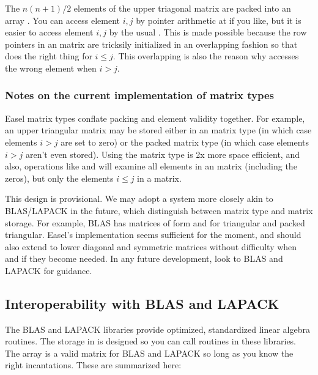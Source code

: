 The $n (n+1) / 2$ elements of the upper triagonal matrix are packed
into an array . You can access element $i,j$ by
pointer arithmetic at  if you
like, but it is easier to access element $i,j$ by the usual
. This is made possible because the row pointers
 in an  matrix are tricksily
initialized in an overlapping fashion so that 
does the right thing for $i \leq j$. This overlapping is also the
reason why  accesses the wrong element when $i>j$.

\subsubsection{Notes on the current implementation of matrix types}

Easel matrix types conflate packing and element validity together. For
example, an upper triangular matrix may be stored either in an
 matrix type (in which case elements $i>j$ are set
to zero) or the packed  matrix type (in which case
elements $i>j$ aren't even stored). Using the  matrix
type is 2x more space efficient, and also, operations like
 and  will
examine all elements in an  matrix (including the
zeros), but only the elements $i \leq j$ in a  matrix.

This design is provisional. We may adopt a system more closely akin to
BLAS/LAPACK in the future, which distinguish between matrix type and
matrix storage. For example, BLAS has matrices of form  and
 for triangular and packed triangular. Easel's
implementation seems sufficient for the moment, and should also extend
to lower diagonal and symmetric matrices without difficulty when and
if they become needed. In any future development, look to BLAS and
LAPACK for guidance.

\subsection{Interoperability with BLAS and LAPACK}

The BLAS and LAPACK libraries provide optimized, standardized linear
algebra routines. The storage in  is designed so
you can call routines in these libraries. The  array
is a valid matrix for BLAS and LAPACK so long as you know the right
incantations. These are summarized here:

